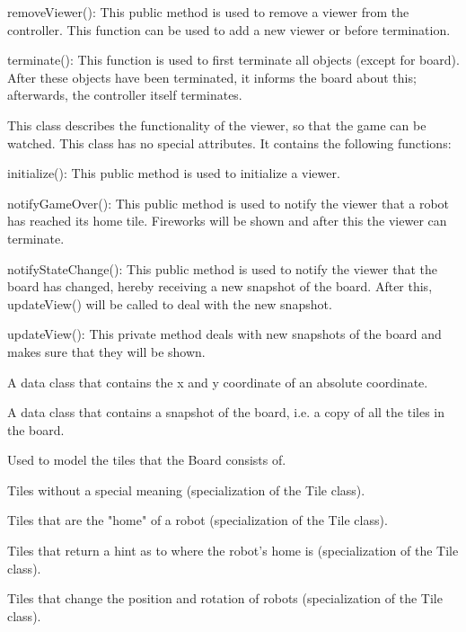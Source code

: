 \begin{description}
\begin{description}
            \item removeViewer(): This public method is used to remove a viewer from the controller. This function can be used to add a new viewer or before termination.
            \item terminate(): This function is used to first terminate all objects (except for board). After these objects have been terminated, it informs the board about this; afterwards, the controller itself terminates.
        \end{description}
        \item[Viewer] This class describes the functionality of the viewer, so that the game can be watched. This class has no special attributes. It contains the following functions:
        \begin{description}
            \item initialize(): This public method is used to initialize a viewer.
            \item notifyGameOver(): This public method is used to notify the viewer that a robot has reached its home tile. Fireworks will be shown and after this the viewer can terminate.
            \item notifyStateChange(): This public method is used to notify the viewer that the board has changed, hereby receiving a new snapshot of the board. After this, updateView() will be called to deal with the new snapshot.
            \item updateView(): This private method deals with new snapshots of the board and makes sure that they will be shown.
        \end{description}
        \item[AbsoluteCoord] A data class that contains the x and y coordinate of an absolute coordinate.
		\item[BoardSnapshot] A data class that contains a snapshot of the board, i.e. a copy of all the tiles in the board.
		\item[Tile] Used to model the tiles that the Board consists of.
		\item[NormalTile] Tiles without a special meaning (specialization of the Tile class).
		\item[HomeTile] Tiles that are the "home" of a robot (specialization of the Tile class).
		\item[HintTile] Tiles that return a hint as to where the robot's home is (specialization of the Tile class).
		\item[ConveyorTile] Tiles that change the position and rotation of robots (specialization of the Tile class).

\end{description}
